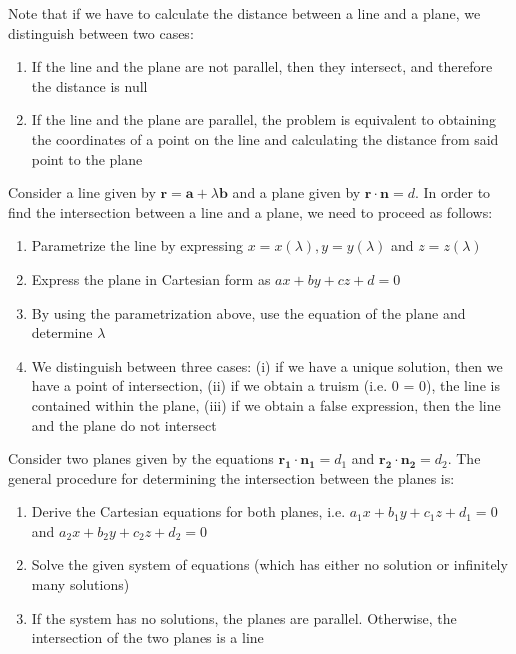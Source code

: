 \documentclass[12pt]{article}
\begin{document}
Note that if we have to calculate the distance between a line and a plane, we distinguish between two cases:

\begin{enumerate}
    \item If the line and the plane are not parallel, then they intersect, and therefore the distance is null
    \item If the line and the plane are parallel, the problem is equivalent to obtaining the coordinates of a point on the line and calculating the distance from said point to the plane
\end{enumerate}

\begin{proposition}
    Consider a line given by $\mathbf{r} = \mathbf{a} + \lambda\mathbf{b}$ and a plane given by $\mathbf{r} \cdot \mathbf{n} = d$. In order to find the intersection between a line and a plane, we need to proceed as follows:

    \begin{enumerate}
        \item Parametrize the line by expressing $x = x(\lambda), y = y(\lambda)$ and $z = z(\lambda)$
        \item Express the plane in Cartesian form as $ax + by + cz + d = 0$
        \item By using the parametrization above, use the equation of the plane and determine $\lambda$
        \item We distinguish between three cases: (i) if we have a unique solution, then we have a point of intersection, (ii) if we obtain a truism (i.e. 0 = 0), the line is contained within the plane, (iii) if we obtain a false expression, then the line and the plane do not intersect
    \end{enumerate}
\end{proposition}

\begin{proposition}
    Consider two planes given by the equations $\mathbf{r_1 \cdot n_1} = d_1$ and $\mathbf{r_2 \cdot n_2} = d_2$. The general procedure for determining the intersection between the planes is:

    \begin{enumerate}
        \item Derive the Cartesian equations for both planes, i.e. $a_1x + b_1y + c_1z + d_1 = 0$ and $a_2x + b_2y + c_2z + d_2 = 0$
        \item Solve the given system of equations (which has either no solution or infinitely many solutions)
        \item If the system has no solutions, the planes are parallel. Otherwise, the intersection of the two planes is a line
    \end{enumerate}
\end{proposition}
\end{document}
